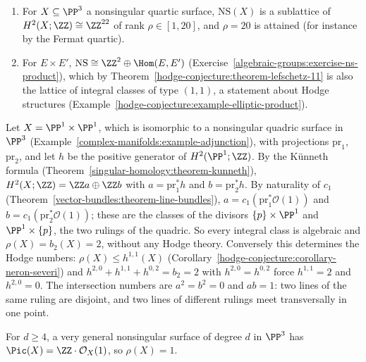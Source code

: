\begin{example}\label{hodge-conjecture:example-neron-severi}
\begin{enumerate}
\item For $X \subseteq \PP^3$ a nonsingular quartic surface, $\mathrm{NS}(X)$ is a sublattice of $H^2(X; \ZZ) \cong \ZZ^{22}$ of rank $\rho \in [1, 20]$, and $\rho = 20$ is attained (for instance by the Fermat quartic).
\item For $E \times E'$, $\mathrm{NS} \cong \ZZ^2 \oplus \Hom(E, E')$ (Exercise~\ref{algebraic-groups:exercise-ns-product}), which by Theorem~\ref{hodge-conjecture:theorem-lefschetz-11} is also the
lattice of integral classes of type $(1,1)$, a statement about Hodge structures (Example~\ref{hodge-conjecture:example-elliptic-product}).
\end{enumerate}
\end{example}

\begin{example}\label{hodge-conjecture:example-quadric}
Let $X = \PP^1 \times \PP^1$, which is isomorphic to a nonsingular quadric surface in $\PP^3$ (Example~\ref{complex-manifolds:example-adjunction}), with projections $\mathrm{pr}_1$, $\mathrm{pr}_2$, and let $h$ be the
positive generator of $H^2(\PP^1; \ZZ)$. By the K\"unneth formula (Theorem~\ref{singular-homology:theorem-kunneth}), $H^2(X; \ZZ) = \ZZ a \oplus \ZZ b$ with $a = \mathrm{pr}_1^*h$ and $b = \mathrm{pr}_2^*h$. By
naturality of $c_1$ (Theorem~\ref{vector-bundles:theorem-line-bundles}), $a = c_1(\mathrm{pr}_1^*\mathcal{O}(1))$ and $b = c_1(\mathrm{pr}_2^*\mathcal{O}(1))$; these are the classes of the divisors
$\{p\} \times \PP^1$ and $\PP^1 \times \{p\}$, the two rulings of the quadric. So every integral class is algebraic and $\rho(X) = b_2(X) = 2$, without any Hodge theory. Conversely this determines the Hodge
numbers: $\rho(X) \leq h^{1,1}(X)$ (Corollary~\ref{hodge-conjecture:corollary-neron-severi}) and $h^{2,0} + h^{1,1} + h^{0,2} = b_2 = 2$ with $h^{2,0} = h^{0,2}$ force $h^{1,1} = 2$ and $h^{2,0} = 0$. The
intersection numbers are $a^2 = b^2 = 0$ and $ab = 1$: two lines of the same ruling are disjoint, and two lines of different rulings meet transversally in one point.
\end{example}

\begin{theorem}\label{hodge-conjecture:theorem-noether-lefschetz}
For $d \geq 4$, a very general nonsingular surface of degree $d$ in $\PP^3$ has $\Pic(X) = \ZZ\cdot\mathcal{O}_X(1)$, so $\rho(X) = 1$.
\end{theorem}

